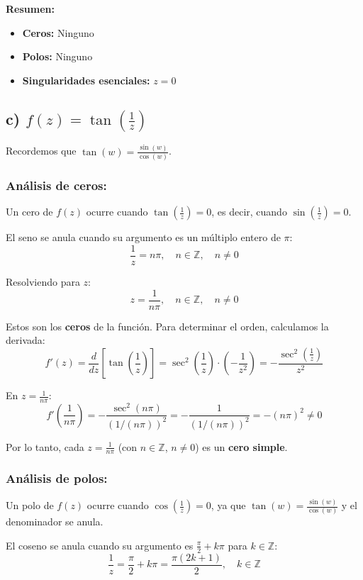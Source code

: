 \documentclass{article}
\begin{document}
\textbf{Resumen:}
\begin{itemize}
\item \textbf{Ceros:} Ninguno
\item \textbf{Polos:} Ninguno
\item \textbf{Singularidades esenciales:} $z = 0$
\end{itemize}

\subsection*{c) $f(z) = \tan\left(\frac{1}{z}\right)$}

Recordemos que $\tan(w) = \frac{\sin(w)}{\cos(w)}$.

\subsubsection*{Análisis de ceros:}

Un cero de $f(z)$ ocurre cuando $\tan\left(\frac{1}{z}\right) = 0$, es decir, cuando $\sin\left(\frac{1}{z}\right) = 0$.

El seno se anula cuando su argumento es un múltiplo entero de $\pi$:
$$\frac{1}{z} = n\pi, \quad n \in \mathbb{Z}, \quad n \neq 0$$

Resolviendo para $z$:
$$z = \frac{1}{n\pi}, \quad n \in \mathbb{Z}, \quad n \neq 0$$

Estos son los \textbf{ceros} de la función. Para determinar el orden, calculamos la derivada:
$$f'(z) = \frac{d}{dz}\left[\tan\left(\frac{1}{z}\right)\right] = \sec^2\left(\frac{1}{z}\right) \cdot \left(-\frac{1}{z^2}\right) = -\frac{\sec^2\left(\frac{1}{z}\right)}{z^2}$$

En $z = \frac{1}{n\pi}$:
$$f'\left(\frac{1}{n\pi}\right) = -\frac{\sec^2(n\pi)}{(1/(n\pi))^2} = -\frac{1}{(1/(n\pi))^2} = -(n\pi)^2 \neq 0$$

Por lo tanto, cada $z = \frac{1}{n\pi}$ (con $n \in \mathbb{Z}$, $n \neq 0$) es un \textbf{cero simple}.

\subsubsection*{Análisis de polos:}

Un polo de $f(z)$ ocurre cuando $\cos\left(\frac{1}{z}\right) = 0$, ya que $\tan(w) = \frac{\sin(w)}{\cos(w)}$ y el denominador se anula.

El coseno se anula cuando su argumento es $\frac{\pi}{2} + k\pi$ para $k \in \mathbb{Z}$:
$$\frac{1}{z} = \frac{\pi}{2} + k\pi = \frac{\pi(2k + 1)}{2}, \quad k \in \mathbb{Z}$$
\end{document}

